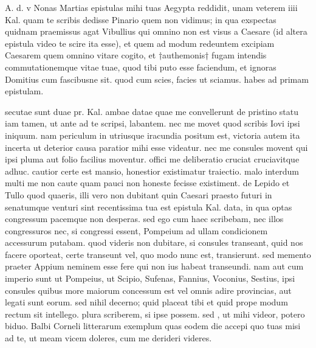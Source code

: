


 A. d. v Nonas Martias epistulas mihi tuas Aegypta reddidit, unam veterem iiii Kal. quam te scribis dedisse Pinario quem non vidimus; in qua exspectas quidnam praemissus agat Vibullius qui omnino non est visus a Caesare (id altera epistula video te scire ita esse), et quem ad modum redeuntem excipiam Caesarem quem omnino vitare cogito, et †authemonis† fugam intendis commutationemque vitae tuae, quod tibi puto esse faciendum, et ignoras Domitius cum fascibusne sit. quod cum scies, facies ut sciamus. habes ad primam epistulam.

 secutae sunt duae pr. Kal. ambae datae quae me convellerunt de pristino statu iam tamen, ut ante ad te scripsi, labantem. nec me movet quod scribis Iovi ipsi iniquum. nam periculum in utriusque iracundia positum est, victoria autem ita incerta ut deterior causa paratior mihi esse videatur. nec me consules movent qui ipsi pluma aut folio facilius moventur. offici me deliberatio cruciat cruciavitque adhuc. cautior certe est mansio, honestior existimatur traiectio. malo interdum multi me non caute quam pauci non honeste fecisse existiment. de Lepido et Tullo quod quaeris, illi vero non dubitant quin Caesari praesto futuri in senatumque venturi sint recentissima tua est epistula Kal. data, in qua optas congressum pacemque non desperas. sed ego cum haec scribebam, nec illos congressuros nec, si congressi essent, Pompeium ad ullam condicionem accessurum putabam. quod videris non dubitare, si consules transeant, quid nos facere oporteat, certe transeunt vel, quo modo nunc est, transierunt. sed memento praeter Appium neminem esse fere qui non ius habeat transeundi. nam aut cum imperio sunt ut Pompeius, ut Scipio, Sufenas, Fannius, Voconius, Sestius, ipsi consules quibus more maiorum concessum est vel omnis adire provincias, aut legati sunt eorum. sed nihil decerno; quid placeat tibi et quid prope modum rectum sit intellego. plura scriberem, si ipse possem. sed , ut mihi videor, potero biduo. Balbi Corneli litterarum exemplum quas eodem die accepi quo tuas misi ad te, ut meam vicem doleres, cum me derideri videres.

